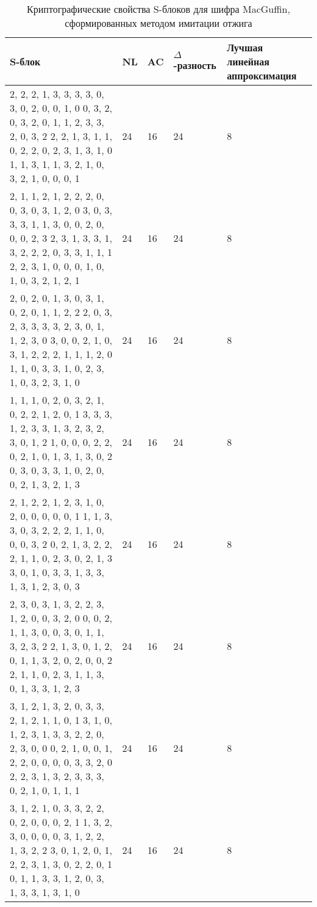 \begin{table}
    \caption{Криптографические свойства S-блоков для шифра MacGuffin, сформированных методом имитации отжига}
    \label{table:sbox_MacGuffin_annealed}
    \centering\begin{tabular}{| m{9cm} | m{0.8cm} | m{0.8cm} | m{1.9cm} | m{2.1cm} |}
        \hline
        S-блок                                          & NL    & AC    & $\Delta$-разность & Лучшая линейная аппроксимация \\ \hline
        2, 2, 2, 1, 3, 3, 3, 3, 0, 3, 0, 2, 0, 0, 1, 0 
        0, 3, 2, 0, 3, 2, 0, 1, 1, 2, 3, 3, 2, 0, 3, 2 
        2, 2, 1, 3, 1, 1, 0, 2, 2, 0, 2, 3, 1, 3, 1, 0 
        1, 1, 3, 1, 1, 3, 2, 1, 0, 3, 2, 1, 0, 0, 0, 1  & 24    & 16    & 24            & 8                 \\ \hline
        2, 1, 1, 2, 1, 2, 2, 2, 0, 0, 3, 0, 3, 1, 2, 0 
        3, 0, 3, 3, 3, 1, 1, 3, 0, 0, 2, 0, 0, 0, 2, 3 
        2, 3, 1, 3, 3, 1, 3, 2, 2, 2, 0, 3, 3, 1, 1, 1 
        2, 2, 3, 1, 0, 0, 0, 1, 0, 1, 0, 3, 2, 1, 2, 1  & 24    & 16    & 24            & 8                 \\ \hline
        2, 0, 2, 0, 1, 3, 0, 3, 1, 0, 2, 0, 1, 1, 2, 2 
        2, 0, 3, 2, 3, 3, 3, 3, 2, 3, 0, 1, 1, 2, 3, 0 
        3, 0, 0, 2, 1, 0, 3, 1, 2, 2, 2, 1, 1, 1, 2, 0 
        1, 1, 0, 3, 3, 1, 0, 2, 3, 1, 0, 3, 2, 3, 1, 0  & 24    & 16    & 24            & 8                 \\ \hline
        1, 1, 1, 0, 2, 0, 3, 2, 1, 0, 2, 2, 1, 2, 0, 1 
        3, 3, 3, 1, 2, 3, 3, 1, 3, 2, 3, 2, 3, 0, 1, 2 
        1, 0, 0, 0, 2, 2, 0, 2, 1, 0, 1, 3, 1, 3, 0, 2 
        0, 3, 0, 3, 3, 1, 0, 2, 0, 0, 2, 1, 3, 2, 1, 3  & 24    & 16    & 24            & 8                 \\ \hline
        2, 1, 2, 2, 1, 2, 3, 1, 0, 2, 0, 0, 0, 0, 0, 1
        1, 1, 3, 3, 0, 3, 2, 2, 2, 1, 1, 0, 0, 0, 3, 2
        0, 2, 1, 3, 2, 2, 2, 1, 1, 0, 2, 3, 0, 2, 1, 3
        3, 0, 1, 0, 3, 3, 1, 3, 3, 1, 3, 1, 2, 3, 0, 3  & 24    & 16    & 24            & 8                 \\ \hline
        2, 3, 0, 3, 1, 3, 2, 2, 3, 1, 2, 0, 0, 3, 2, 0
        0, 0, 2, 1, 1, 3, 0, 0, 3, 0, 1, 1, 3, 2, 3, 2
        2, 1, 3, 0, 1, 2, 0, 1, 1, 3, 2, 0, 2, 0, 0, 2
        2, 1, 1, 0, 2, 3, 1, 1, 3, 0, 1, 3, 3, 1, 2, 3  & 24    & 16    & 24            & 8                 \\ \hline
        3, 1, 2, 1, 3, 2, 0, 3, 3, 2, 1, 2, 1, 1, 0, 1
        3, 1, 0, 1, 2, 3, 1, 3, 3, 2, 2, 0, 2, 3, 0, 0
        0, 2, 1, 0, 0, 1, 2, 2, 0, 0, 0, 0, 3, 3, 2, 0
        2, 2, 3, 1, 3, 2, 3, 3, 3, 0, 2, 1, 0, 1, 1, 1  & 24    & 16    & 24            & 8                 \\ \hline
        3, 1, 2, 1, 0, 3, 3, 2, 2, 0, 2, 0, 0, 0, 2, 1
        1, 3, 2, 3, 0, 0, 0, 0, 3, 1, 2, 2, 1, 3, 2, 2
        3, 0, 1, 2, 0, 1, 2, 2, 3, 1, 3, 0, 2, 2, 0, 1
        0, 1, 1, 3, 3, 1, 2, 0, 3, 1, 3, 3, 1, 3, 1, 0  & 24    & 16    & 24            & 8                 \\ \hline
    \end{tabular}
\end{table}

